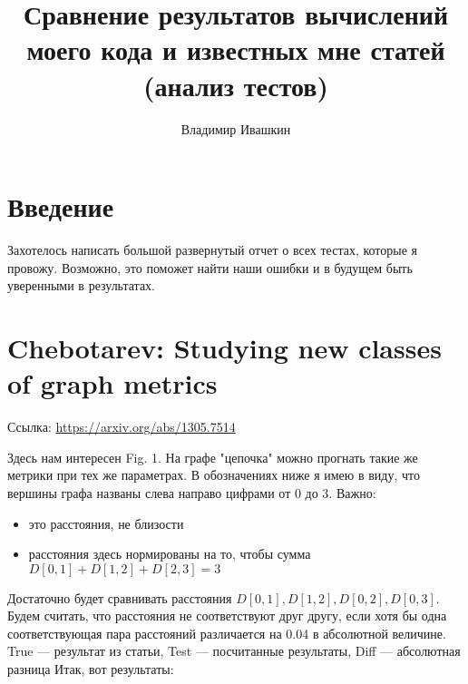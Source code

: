 \documentclass{article}
\title{
	Сравнение результатов вычислений моего кода и известных мне статей (анализ тестов)
}
\author{Владимир Ивашкин}
\begin{document}
\maketitle

\section{Введение}
Захотелось написать большой развернутый отчет о всех тестах, которые я провожу. Возможно, это поможет найти наши ошибки и в будущем быть уверенными в результатах.

\section{Chebotarev: Studying new classes of graph metrics}
Ссылка: \url{https://arxiv.org/abs/1305.7514}

Здесь нам интересен Fig. 1. На графе "цепочка" можно прогнать такие же метрики при тех же параметрах. В обозначениях ниже я имею в виду, что вершины графа названы слева направо цифрами от 0 до 3. Важно:
\begin{itemize}
  \item это расстояния, не близости
  \item расстояния здесь нормированы на то, чтобы сумма $D[0, 1] + D[1, 2] + D[2, 3] = 3$
\end{itemize}
Достаточно будет сравнивать расстояния $D[0, 1], D[1, 2], D[0, 2], D[0, 3]$.
Будем считать, что расстояния не соответствуют друг другу, если хотя бы одна соответствующая пара расстояний различается на 0.04 в абсолютной величине.
True --- результат из статьи, Test --- посчитанные результаты, Diff --- абсолютная разница
Итак, вот результаты:
\end{document}
